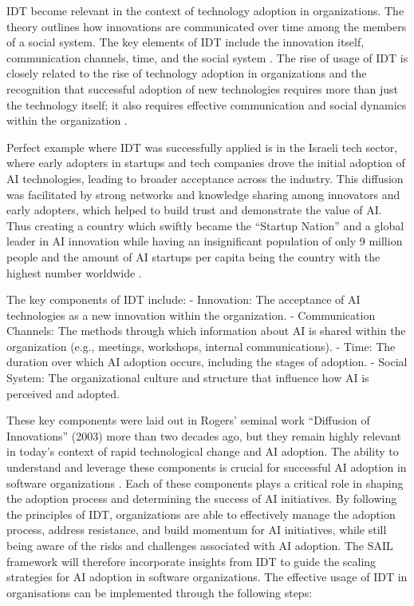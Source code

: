 \documentclass[]{imc-inf}
\begin{document}
IDT become relevant in the context of technology adoption in
organizations. The theory outlines how innovations are communicated over
time among the members of a social system. The key elements of IDT
include the innovation itself, communication channels, time, and the
social system \citep{Dearing2009}. The rise of usage of IDT is closely related to the rise
of technology adoption in organizations and the recognition that
successful adoption of new technologies requires more than just the
technology itself; it also requires effective communication and social
dynamics within the organization \citep{Almaiah2022}.

Perfect example where IDT was successfully applied is in the Israeli
tech sector, where early adopters in startups and tech companies drove
the initial adoption of AI technologies, leading to broader acceptance
across the industry. This diffusion was facilitated by strong networks
and knowledge sharing among innovators and early adopters, which helped
to build trust and demonstrate the value of AI. Thus creating a country
which swiftly became the ``Startup Nation'' and a global leader in AI
innovation while having an insignificant population of only 9 million
people and the amount of AI startups per capita being the country with
the highest number worldwide \citep{StartupGenome2024, StartupNationCentral2024}.


The key components of IDT include: - Innovation: The acceptance of AI
technologies as a new innovation within the organization. -
Communication Channels: The methods through which information about AI
is shared within the organization (e.g., meetings, workshops, internal
communications). - Time: The duration over which AI adoption occurs,
including the stages of adoption. - Social System: The organizational
culture and structure that influence how AI is perceived and adopted.

These key components were laid out in Rogers' seminal work ``Diffusion
of Innovations'' (2003) more than two decades ago, but they remain
highly relevant in today's context of rapid technological change and AI
adoption. The ability to understand and leverage these components is
crucial for successful AI adoption in software organizations \citep{Schneider2023}. Each of
these components plays a critical role in shaping the adoption process
and determining the success of AI initiatives. By following the
principles of IDT, organizations are able to effectively manage the
adoption process, address resistance, and build momentum for AI
initiatives, while still being aware of the risks and challenges
associated with AI adoption. The SAIL framework will therefore
incorporate insights from IDT to guide the scaling strategies for AI
adoption in software organizations. The effective usage of IDT in
organisations can be implemented through the following steps:
\end{document}
